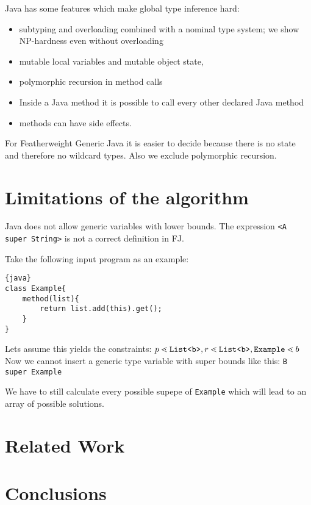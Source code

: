 \documentclass[a4paper,USenglish,cleveref, autoref, thm-restate]{lipics-v2021}
\begin{document}
Java has some features which make global type inference hard:
\begin{itemize}
\item subtyping and overloading combined with a nominal type system;
  we show NP-hardness even without overloading
\item mutable local variables and mutable object state,
\item polymorphic recursion in method calls
\item Inside a Java method it is possible to call every other declared Java method
\item methods can have side effects.
\end{itemize}


For Featherweight Generic Java it is easier to decide because there is no state and therefore no wildcard types.
Also we exclude polymorphic recursion.


\section{Limitations of the algorithm}
\label{sec:limits-algorithm}

Java does not allow generic variables with lower bounds.
The expression \texttt{<A super String>} is not a correct definition in FJ.

Take the following input program as an example:
\begin{lstlisting}{java}
class Example{
    method(list){
        return list.add(this).get();
    }
}
\end{lstlisting}
Lets assume this yields the constraints:
$p \lessdot \mathtt{List \texttt{<} b \texttt{>} }, r \lessdot \mathtt{List \texttt{<} b \texttt{>} }, \texttt{Example} \lessdot b$
Now we cannot insert a generic type variable with super bounds like this:
\texttt{B super Example}

We have to still calculate every possible supepe of \texttt{Example} which will lead to an array of possible solutions.


\section{Related Work}
\label{sec:related-work}



\section{Conclusions}
\label{sec:conclusions}


%

\end{document}
